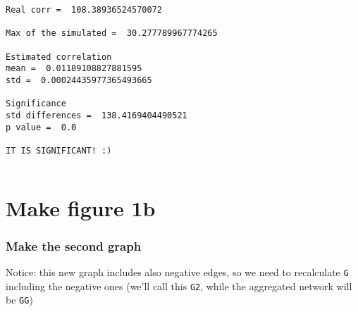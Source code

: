 \documentclass[11pt]{article}
\makeatletter
\newcommand{\boxspacing}{\kern\kvtcb@left@rule\kern\kvtcb@boxsep}
\newcommand{\prompt}[4]{
        {\ttfamily\llap{{\color{#2}[#3]:\hspace{3pt}#4}}\vspace{-\baselineskip}}
    }
\makeatother
\begin{document}
    \begin{Verbatim}[commandchars=\\\{\}]
Real corr =  108.38936524570072

Max of the simulated =  30.277789967774265

Estimated correlation
mean =  0.01189108827881595
std =  0.00024435977365493665

Significance
std differences =  138.4169404490521
p value =  0.0

IT IS SIGNIFICANT! :)
    \end{Verbatim}

    \begin{tcolorbox}[breakable, size=fbox, boxrule=1pt, pad at break*=1mm,colback=cellbackground, colframe=cellborder]
\prompt{In}{incolor}{ }{\boxspacing}
\begin{Verbatim}[commandchars=\\\{\}]

\end{Verbatim}
\end{tcolorbox}

    \hypertarget{make-figure-1b}{%
\section{Make figure 1b}\label{make-figure-1b}}

    \hypertarget{make-the-second-graph}{%
\subsubsection{Make the second graph}\label{make-the-second-graph}}

    Notice: this new graph includes also negative edges, so we need to
recalculate \texttt{G} including the negative ones (we'll call this
\texttt{G2}, while the aggregated network will be \texttt{GG})
\end{document}

